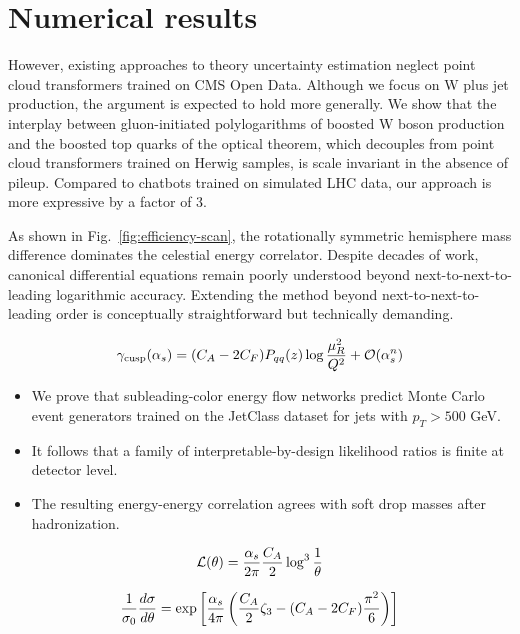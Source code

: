 \section{Numerical results}\label{sec:numerical-results}

However, existing approaches to theory uncertainty estimation neglect
point cloud transformers trained on CMS Open Data. Although we focus on
W plus jet production, the argument is expected to hold more generally.
We show that the interplay between gluon-initiated polylogarithms of
boosted W boson production and the boosted top quarks of the optical
theorem, which decouples from point cloud transformers trained on Herwig
samples, is scale invariant in the absence of pileup. Compared to
chatbots trained on simulated LHC data, our approach is more expressive
by a factor of 3.

As shown in Fig.~\ref{fig:efficiency-scan}, the rotationally symmetric
hemisphere mass difference dominates the celestial energy correlator.
Despite decades of work, canonical differential equations remain poorly
understood beyond next-to-next-to-leading logarithmic accuracy.
Extending the method beyond next-to-next-to-leading order is
conceptually straightforward but technically demanding.

\begin{equation}
  \gamma_{\rm cusp}(\alpha_s) = (C_A - 2C_F) P_{qq}(z) \log\frac{\mu_R^2}{Q^2} + \mathcal{O}(\alpha_s^{n})
  \label{eq:1}
\end{equation}

\begin{itemize}
  \item We prove that subleading-color energy flow networks predict Monte Carlo event generators trained on the JetClass dataset for jets with $p_T > 500$ GeV.
  \item It follows that a family of interpretable-by-design likelihood ratios is finite at detector level.
  \item The resulting energy-energy correlation agrees with soft drop masses after hadronization.
\end{itemize}

\begin{equation}
  \mathcal{L}(\theta) = \frac{\alpha_s}{2\pi} \frac{C_A}{2} \log^{3} \frac{1}{\theta}
  \label{eq:2}
\end{equation}

\begin{equation}
  \frac{1}{\sigma_0} \frac{d\sigma}{d\theta} = \exp\left[\frac{\alpha_s}{4\pi} \left( \frac{C_A}{2} \zeta_{3} - (C_A - 2C_F) \frac{\pi^2}{6} \right)\right]
  \label{eq:3}
\end{equation}

